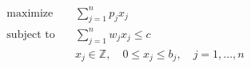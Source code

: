 \begin{align*}
\text{maximize} \quad & \sum_{j=1}^n p_j x_j \\
\text{subject to} \quad & \sum_{j=1}^n w_j x_j \leq c \\
& x_j \in \mathbb{Z}, \quad 0 \leq x_j \leq b_j, \quad j = 1, \ldots,n
\end{align*}
